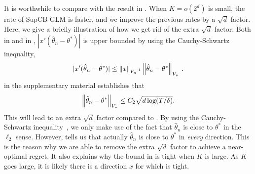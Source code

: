 It is worthwhile to compare  with the result in . When $K =o(2^{d})$ is small, the rate of SupCB-GLM is faster, and we improve the previous rates by a $\sqrt{d}$ factor. Here, we give a briefly illustration of how we get rid of the extra $\sqrt{d}$ factor. Both in  and in \citet{filippi2010parametric},  $|x'(\hat{\theta}_n-\theta^*)|$ is upper bounded by using the Cauchy-Schwartz inequality,
\begin{equation} \label{eq:cauchy}
|x'(\hat{\theta}_n-\theta^*)| \le \left\|x\right\|_{V_n^{-1}} \left\|\hat{\theta}_n - \theta^*\right\|_{V_n}\,.
\end{equation}
 in the supplementary material establishes that
\[ \left\|\hat{\theta}_n - \theta^*\right\|_{V_n} 
\le C_2 \sqrt{d\log(T/\delta)}.\] 
This will lead to an extra $\sqrt{d}$ factor compared to . By using the Cauchy-Schwartz inequality~, we only make use of the fact that $\hat{\theta}_n$ is close to $\theta^*$ in the $\ell_2$ sense. However,  tells us that actually $\hat{\theta}_n$ is close to $\theta^*$ in \emph{every} direction. This is the reason why we are able to remove the extra $\sqrt{d}$ factor to achieve a near-optimal regret.  It also explains why the bound in  is tight when $K$ is large. As $K$ goes large, it is likely there is a direction $x$ for which  is tight.

